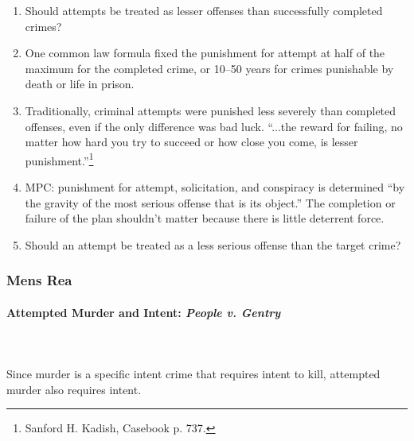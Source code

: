 \begin{enumerate}
    \item Should attempts be treated as lesser offenses than successfully 
    completed crimes?
    \item One common law formula fixed the punishment for attempt at half of 
    the maximum for the completed crime, or 10--50 years for crimes punishable 
    by death or life in prison.
    \item Traditionally, criminal attempts were punished less severely than 
    completed offenses, even if the only difference was bad luck. ``...the 
    reward for failing, no matter how hard you try to succeed or how close you 
    come, is lesser punishment.''\footnote{Sanford H. Kadish, Casebook p.  
    737.}
    \item MPC: punishment for attempt, solicitation, and conspiracy is 
    determined ``by the gravity of the most serious offense that is its 
    object.'' The completion or failure of the plan shouldn't matter because 
    there is little deterrent force.
    \item Should an attempt be treated as a less serious offense than the 
    target crime?
\end{enumerate}

\subsubsection{Mens Rea}

\paragraph{Attempted Murder and Intent: \emph{People v. Gentry}}
~\\\\
Since murder is a specific intent crime that requires intent to kill, 
attempted murder also requires intent.

